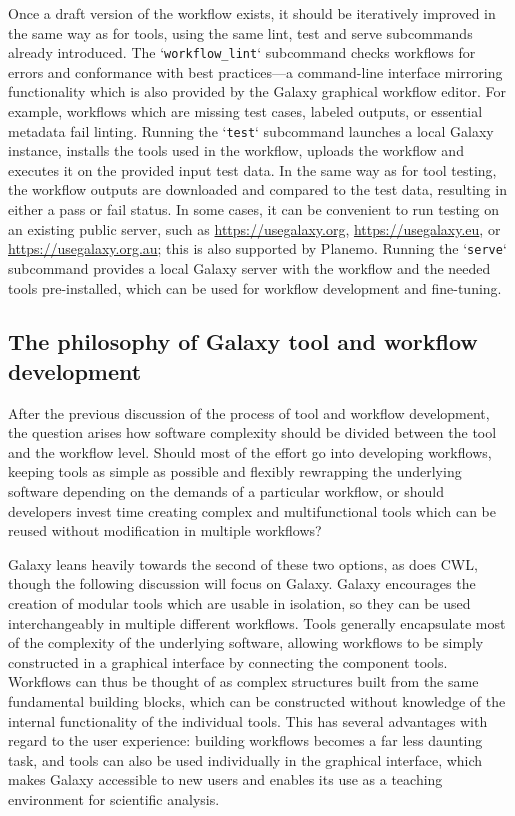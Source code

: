 Once a draft version of the workflow exists, it should be iteratively
improved in the same way as for tools, using the same lint, test and
serve subcommands already introduced. The `\texttt{workflow\_lint}`
subcommand checks workflows for errors and conformance with best
practices---a command-line interface mirroring functionality which is
also provided by the Galaxy graphical workflow editor. For example,
workflows which are missing test cases, labeled outputs, or essential
metadata fail linting. Running the `\texttt{test}` subcommand launches a
local Galaxy instance, installs the tools used in the workflow, uploads
the workflow and executes it on the provided input test data. In the
same way as for tool testing, the workflow outputs are downloaded and
compared to the test data, resulting in either a pass or fail status. In
some cases, it can be convenient to run testing on an existing public
server, such as
\protect\hypertarget{ext-link-10}{\url{https://usegalaxy.org}},
\protect\hypertarget{ext-link-11}{\url{https://usegalaxy.eu}}, or
\protect\hypertarget{ext-link-12}{\url{https://usegalaxy.org.au}}; this
is also supported by Planemo. Running the `\texttt{serve}` subcommand
provides a local Galaxy server with the workflow and the needed tools
pre-installed, which can be used for workflow development and
fine-tuning.

\subsection*{The philosophy of Galaxy tool and workflow
development}

After the previous discussion of the process of tool and workflow
development, the question arises how software complexity should be
divided between the tool and the workflow level. Should most of the
effort go into developing workflows, keeping tools as simple as possible
and flexibly rewrapping the underlying software depending on the demands
of a particular workflow, or should developers invest time creating
complex and multifunctional tools which can be reused without
modification in multiple workflows?

Galaxy leans heavily towards the second of these two options, as does
CWL, though the following discussion will focus on Galaxy. Galaxy
encourages the creation of modular tools which are usable in isolation,
so they can be used interchangeably in multiple different workflows.
Tools generally encapsulate most of the complexity of the underlying
software, allowing workflows to be simply constructed in a graphical
interface by connecting the component tools. Workflows can thus be
thought of as complex structures built from the same fundamental
building blocks, which can be constructed without knowledge of the
internal functionality of the individual tools. This has several
advantages with regard to the user experience: building workflows
becomes a far less daunting task, and tools can also be used
individually in the graphical interface, which makes Galaxy accessible
to new users and enables its use as a teaching environment for
scientific analysis.


